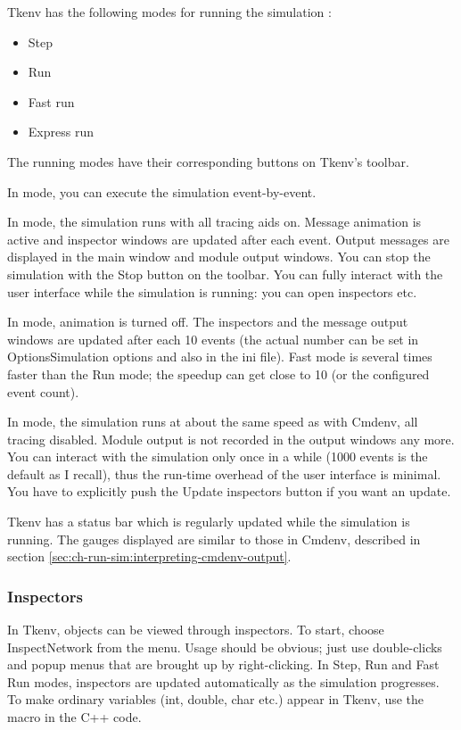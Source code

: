 Tkenv has the following modes for running the simulation :

\begin{itemize}
   \item{Step}
   \item{Run}
   \item{Fast run}
   \item{Express run}
\end{itemize}


The running modes have their corresponding buttons on Tkenv's
toolbar.


In  mode, you can execute the simulation event-by-event.

In  mode, the simulation runs with all tracing aids on.
Message animation is active and inspector windows are updated
after each event. Output messages are displayed in the main window
and module output windows. You can stop the simulation with the
Stop button on the toolbar. You can fully interact with the user
interface while the simulation is running: you can open inspectors
etc.

In  mode, animation is turned off. The inspectors and
the message output windows are updated after each 10 events (the
actual number can be set in Options{\textbar}Simulation options and
also in the ini file). Fast mode is several times faster than
the Run mode; the speedup can get close to 10 (or the configured
event count).

In  mode, the simulation runs at about the same speed
as with Cmdenv, all tracing disabled. Module output is not recorded
in the output windows any more. You can interact with the simulation
only once in a while (1000 events is the default as I recall),
thus the run-time overhead of the user interface is minimal.
You have to explicitly push the Update inspectors button if you
want an update.

Tkenv has a status bar which is regularly updated while the simulation
is running. The gauges displayed are similar to those in Cmdenv,
described in section \ref{sec:ch-run-sim:interpreting-cmdenv-output}.


\subsubsection{Inspectors}


In Tkenv, objects can be viewed through inspectors. To start, choose
Inspect{\textbar}Network from the menu. Usage should be obvious; just
use double-clicks and popup menus that are brought up by
right-clicking. In Step, Run and Fast Run modes, inspectors are
updated automatically as the simulation progresses. To make ordinary
variables (int, double, char etc.) appear in Tkenv, use the
 macro in the C++ code.

